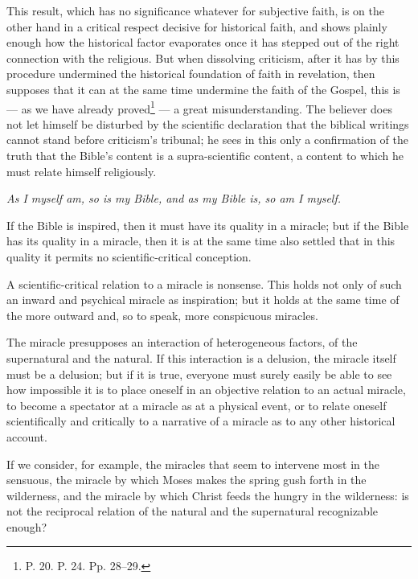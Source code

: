 \documentclass[12pt,a4paper]{book}
\begin{document}
This result, which has no significance whatever for subjective faith, is on the
other hand in a critical respect decisive for
historical faith, and shows plainly enough how the historical factor evaporates
once it has stepped out of the right connection with the religious. But when
dissolving criticism, after it has by this procedure undermined the historical
foundation of faith in revelation, then supposes that it can at the same time
undermine the faith of the Gospel, this is --- as we have already
proved\footnote{P. 20. P. 24. Pp. 28--29.} --- a great misunderstanding. The
believer does not let himself be disturbed by the scientific declaration that the
biblical writings cannot stand before criticism's tribunal; he sees in this only a
confirmation of the truth that the Bible's content is a supra-scientific content, a
content to which he must relate himself religiously.

\emph{As I myself am, so is my Bible, and as my Bible is, so am I myself.}

If the Bible is inspired, then it must have its quality in a miracle; but if the
Bible has its quality in a miracle, then it is at the same time also settled that
in this quality it permits no scientific-critical conception.

A scientific-critical relation to a miracle is nonsense. This holds not only of
such an inward and psychical miracle as inspiration; but it holds at the same time
of the more outward and, so to speak, more conspicuous miracles.

The miracle presupposes an interaction of heterogeneous factors, of the
supernatural and the natural. If this interaction is a delusion, the miracle itself
must be a delusion; but if it is true, everyone must surely easily be able to see
how impossible it is to place oneself in an objective relation to an actual
miracle, to become a spectator at a miracle as at a physical event, or to relate
oneself scientifically and critically to a narrative of a miracle as to any other
historical account.

If we consider, for example, the miracles that seem to intervene most
in the sensuous, the miracle by which Moses makes the spring gush forth in the
wilderness, and the miracle by which Christ feeds the hungry in the wilderness: is
not the reciprocal relation of the natural and the supernatural recognizable
enough?
\end{document}

